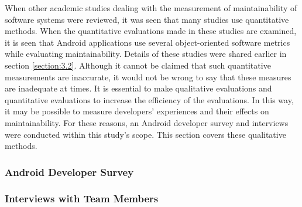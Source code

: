 When other academic studies dealing with the measurement of maintainability of software systems were reviewed, it was seen that many studies use quantitative methods. When the quantitative evaluations made in these studies are examined, it is seen that Android applications use several object-oriented software metrics while evaluating maintainability. Details of these studies were shared earlier in section \ref{section:3.2}. Although it cannot be claimed that such quantitative measurements are inaccurate, it would not be wrong to say that these measures are inadequate at times. It is essential to make qualitative evaluations and quantitative evaluations to increase the efficiency of the evaluations. In this way, it may be possible to measure developers' experiences and their effects on maintainability. For these reasons, an Android developer survey and interviews were conducted within this study's scope. This section covers these qualitative methods.

\subsubsection{Android Developer Survey}
\label{section:4.1.1}


\subsubsection{Interviews with Team Members}
\label{section:4.1.2}

